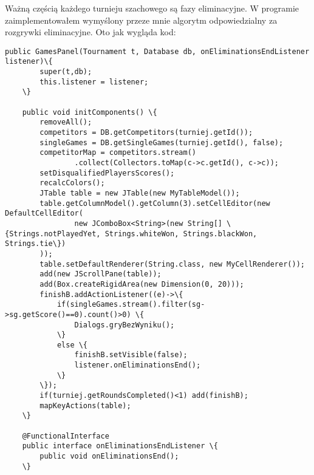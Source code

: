 Ważną częścią każdego turnieju szachowego są fazy eliminacyjne. W programie zaimplementowałem wymyślony przeze mnie algorytm odpowiedzialny za rozgrywki eliminacyjne. Oto jak wygląda kod:
\begin{verbatim}
public GamesPanel(Tournament t, Database db, onEliminationsEndListener listener)\{
		super(t,db);
		this.listener = listener;
	\}
	
	public void initComponents() \{
		removeAll();
		competitors = DB.getCompetitors(turniej.getId());
		singleGames = DB.getSingleGames(turniej.getId(), false);
		competitorMap = competitors.stream()
				.collect(Collectors.toMap(c->c.getId(), c->c));
		setDisqualifiedPlayersScores();
		recalcColors();
		JTable table = new JTable(new MyTableModel());
		table.getColumnModel().getColumn(3).setCellEditor(new DefaultCellEditor(
        		new JComboBox<String>(new String[] \{Strings.notPlayedYet, Strings.whiteWon, Strings.blackWon, Strings.tie\})
        ));
		table.setDefaultRenderer(String.class, new MyCellRenderer());
		add(new JScrollPane(table));
		add(Box.createRigidArea(new Dimension(0, 20)));
		finishB.addActionListener((e)->\{
			if(singleGames.stream().filter(sg->sg.getScore()==0).count()>0) \{
				Dialogs.gryBezWyniku();
			\}
			else \{
				finishB.setVisible(false);
				listener.onEliminationsEnd();
			\}
		\});
		if(turniej.getRoundsCompleted()<1) add(finishB);
		mapKeyActions(table);
	\}
	
	@FunctionalInterface 
	public interface onEliminationsEndListener \{
		public void onEliminationsEnd();
	\}
\end{verbatim}

